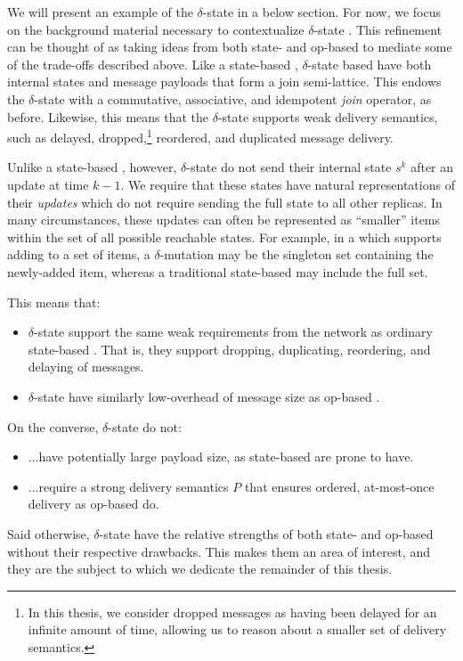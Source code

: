 We will present an example of the $\delta$-state \CRDT in a below section. For
now, we focus on the background material necessary to contextualize
$\delta$-state \CRDTs. This refinement can be thought of as taking ideas from
both state- and op-based \CRDTs to mediate some of the trade-offs described
above. Like a state-based \CRDT, $\delta$-state based \CRDTs have both internal
states and message payloads that form a join semi-lattice. This endows the
$\delta$-state \CRDT with a commutative, associative, and idempotent \emph{join}
operator, as before. Likewise, this means that the $\delta$-state \CRDT supports
weak delivery semantics, such as delayed, dropped,\footnote{In this thesis, we
consider dropped messages as having been delayed for an infinite amount of time,
allowing us to reason about a smaller set of delivery semantics.} reordered,
and duplicated message delivery.

Unlike a state-based \CRDT, however, $\delta$-state \CRDTs do not send their
internal state $s^k$ after an update at time $k-1$. We require that these states
have natural representations of their \emph{updates} which do not require
sending the full state to all other replicas. In many circumstances, these
updates can often be represented as ``smaller'' items within the set of all
possible reachable states. For example, in a \CRDT which supports adding to a
set of items, a $\delta$-mutation may be the singleton set containing the
newly-added item, whereas a traditional state-based \CRDT may include the full
set.

This means that:
\begin{itemize}
  \item $\delta$-state \CRDTs support the same weak requirements from the network
    as ordinary state-based \CRDTs. That is, they support dropping, duplicating,
    reordering, and delaying of messages.
  \item $\delta$-state \CRDTs have similarly low-overhead of message size as
    op-based \CRDTs.
\end{itemize}
On the converse, $\delta$-state \CRDTs do not:
\begin{itemize}
  \item ...have potentially large payload size, as state-based \CRDTs are prone
    to have.
  \item ...require a strong delivery semantics $P$ that ensures ordered,
    at-most-once delivery as op-based \CRDTs do.
\end{itemize}
Said otherwise, $\delta$-state \CRDTs have the relative strengths of both state-
and op-based \CRDTs without their respective drawbacks. This makes them an area
of interest, and they are the subject to which we dedicate the remainder of this
thesis.

